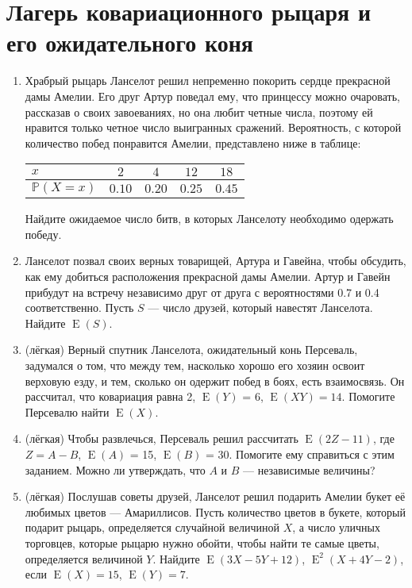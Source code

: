 \documentclass[a4paper,12pt]{article}
\DeclareMathOperator{\E}{E}
\def \P{\mathbb{P}}
\begin{document}
\section{Лагерь ковариационного рыцаря и его ожидательного коня}
\begin{enumerate} %
\item Храбрый рыцарь Ланселот решил непременно покорить сердце прекрасной дамы Амелии. Его друг Артур поведал ему, что принцессу можно очаровать, рассказав о своих завоеваниях, но она любит четные числа, поэтому ей нравится только четное число выигранных сражений. Вероятность, с которой количество побед понравится Амелии, представлено ниже в таблице:
\begin{center}\begin{tabular}{lcccc}
\toprule
 $x$     & $2$  & $4$   & $12$ & $18$  \\ \midrule
$\P(X=x)$                 & $0.10$ & $0.20$ & $0.25$ & $0.45$\\
 \bottomrule
\end{tabular}\end{center}
Найдите ожидаемое число битв, в которых Ланселоту необходимо одержать победу.
\item Ланселот позвал своих верных товарищей, Артура и Гавейна, чтобы обсудить, как ему добиться расположения прекрасной дамы Амелии. Артур и Гавейн прибудут на встречу независимо друг от друга с вероятностями 0.7 и 0.4 соответственно. 
Пусть $S$ — число друзей, который навестят Ланселота. Найдите $\E(S)$.
\item (лёгкая) Верный спутник Ланселота, ожидательный конь Персеваль, задумался о том, что между тем, насколько хорошо его хозяин освоит верховую езду, и тем, сколько он одержит побед в боях, есть взаимосвязь. Он рассчитал, что ковариация равна 2, $\E(Y)$ = 6, $\E(XY) = 14$. Помогите Персевалю найти $\E(X)$.
\item (лёгкая) Чтобы развлечься, Персеваль решил рассчитать $\E(2Z-11)$, где $Z=A-B$, $\E(A)$ = 15, $\E(B)$ = 30. Помогите ему справиться с этим заданием. 
Можно ли утверждать, что $A$ и $B$ — независимые величины?
\item (лёгкая) Послушав советы друзей, Ланселот решил подарить Амелии букет её любимых цветов — Амариллисов. Пусть количество цветов в букете, который подарит рыцарь, определяется случайной величиной $X$, а число уличных торговцев, которые рыцарю нужно обойти, чтобы найти те самые цветы, определяется величиной $Y$. Найдите $\E(3X-5Y+12)$, $\E^2(X+4Y-2)$, если $\E(X)=15$, $\E(Y)=7$.
\end{enumerate}
\end{document}
